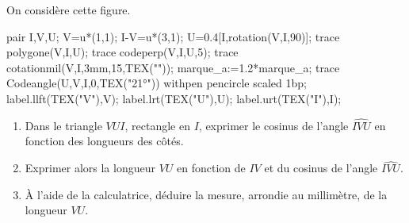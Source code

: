 \begin{exercice*}
    On considère cette figure.

    \begin{center}
        \begin{Geometrie}
            pair I,V,U;
            V=u*(1,1);
            I-V=u*(3,1);
            U=0.4[I,rotation(V,I,90)];
            trace polygone(V,I,U);
            trace codeperp(V,I,U,5);
            trace cotationmil(V,I,3mm,15,TEX(""));
            marque_a:=1.2*marque_a;                
            trace Codeangle(U,V,I,0,TEX("\ang{21}")) withpen pencircle scaled 1bp;
            label.llft(TEX("V"),V);
            label.lrt(TEX("U"),U);
            label.urt(TEX("I"),I);
        \end{Geometrie}
    \end{center}
    \begin{enumerate}
        \item Dans le triangle $VUI$, rectangle en $I$, exprimer le cosinus de l'angle $\widehat{IVU}$ en fonction des longueurs des côtés.
        \item Exprimer alors la longueur $VU$ en fonction de $IV$ et du cosinus de l'angle $\widehat{IVU}$.
        \item À l'aide de la calculatrice, déduire la mesure, arrondie au millimètre, de la longueur $VU$.
    \end{enumerate}
\end{exercice*}

